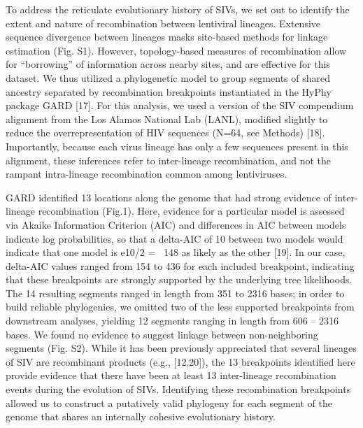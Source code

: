 To address the reticulate evolutionary history of SIVs, we set out to identify the extent and nature of recombination between lentiviral lineages.
Extensive sequence divergence between lineages masks site-based methods for linkage estimation (Fig. S1).
However, topology-based measures of recombination allow for “borrowing” of information across nearby sites, and are effective for this dataset.
We thus utilized a phylogenetic model to group segments of shared ancestry separated by recombination breakpoints instantiated in the HyPhy package GARD [17].
For this analysis, we used a version of the SIV compendium alignment from the Los Alamos National Lab (LANL), modified slightly to reduce the overrepresentation of HIV sequences (N=64, see Methods) [18].
Importantly, because each virus lineage has only a few sequences present in this alignment, these inferences refer to inter-lineage recombination, and not the rampant intra-lineage recombination common among lentiviruses.

GARD identified 13 locations along the genome that had strong evidence of inter-lineage recombination (Fig.1).
Here, evidence for a particular model is assessed via Akaike Information Criterion (AIC) and differences in AIC between models indicate log probabilities, so that a delta-AIC of 10 between two models would indicate that one model is e10/2 = ~148 as likely as the other [19].
In our case, delta-AIC values ranged from 154 to 436 for each included breakpoint, indicating that these breakpoints are strongly supported by the underlying tree likelihoods.
The 14 resulting segments ranged in length from 351 to 2316 bases; in order to build reliable phylogenies, we omitted two of the less supported breakpoints from downstream analyses, yielding 12 segments ranging in length from 606 – 2316 bases.
We found no evidence to suggest linkage between non-neighboring segments (Fig. S2).
While it has been previously appreciated that several lineages of SIV are recombinant products (e.g., [12,20]), the 13 breakpoints identified here provide evidence that there have been at least 13 inter-lineage recombination events during the evolution of SIVs.
Identifying these recombination breakpoints allowed us to construct a putatively valid phylogeny for each segment of the genome that shares an internally cohesive evolutionary history.


